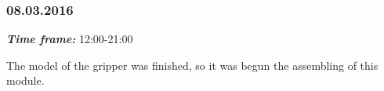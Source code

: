 \subsubsection{08.03.2016}
\textit{\textbf{Time frame:}} 12:00-21:00 

The model of the gripper was finished, so it was begun the assembling of this module.

\begin{figure}[H]
	\begin{minipage}[h]{1\linewidth}
		\caption{}
		\label{Shiftbuc2.8}
	\end{minipage}
\end{figure}
